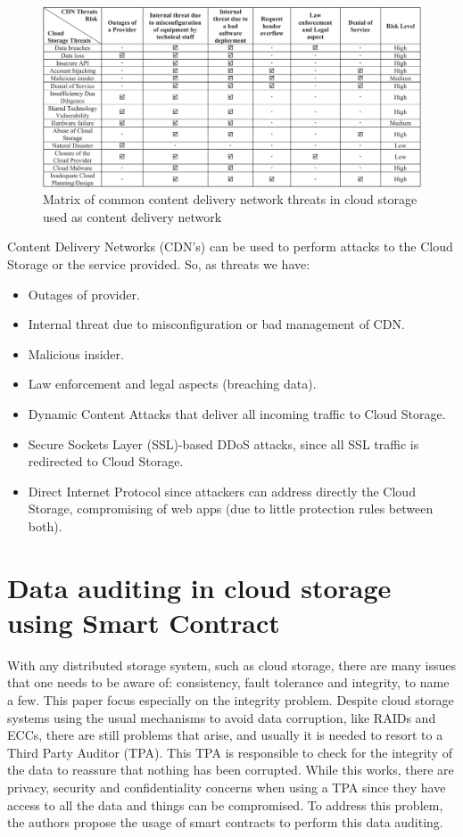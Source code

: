 \documentclass[14pt,oneside]{extreport}
\newcommand*\fpar{\hspace{1ex}}
\begin{document}
\begin{figure}[H]
  \centering
  \includegraphics[width=\textwidth]{paper3/3_table.png}
  \caption{Matrix of common content delivery network threats in cloud storage used as content delivery network}
  \label{fig:table}
\end{figure}

\fpar Content Delivery Networks (CDN's) can be used to perform attacks to the Cloud Storage or the service provided. So, as threats we have: 
\begin{itemize}[noitemsep]
  \item Outages of provider.
  \item Internal threat due to misconfiguration or bad management of CDN.
  \item Malicious insider.
  \item Law enforcement and legal aspects (breaching data). 
  \item Dynamic Content Attacks that deliver all incoming traffic to Cloud Storage. 
  \item Secure Sockets Layer (SSL)-based DDoS attacks, since all SSL traffic is redirected to Cloud Storage. 
  \item Direct Internet Protocol since attackers can address directly the Cloud Storage, compromising of web apps (due to little protection rules between both).
\end{itemize}

\chapter{\Large{Data auditing in cloud storage using Smart Contract \cite{paper4}}}
\vspace{-2em}
\fpar With any distributed storage system, such as cloud storage, there are many issues that one needs to be aware of: consistency, fault tolerance and integrity, to name a few. This paper focus especially on the integrity problem. Despite cloud storage systems using the usual mechanisms to avoid data corruption, like RAIDs and ECCs, there are still problems that arise, and usually it is needed to resort to a Third Party Auditor (TPA). This TPA is responsible to check for the integrity of the data to reassure that nothing has been corrupted. While this works, there are privacy, security and confidentiality concerns when using a TPA since they have access to all the data and things can be compromised. To address this problem, the authors propose the usage of smart contracts to perform this data auditing.
\end{document}
